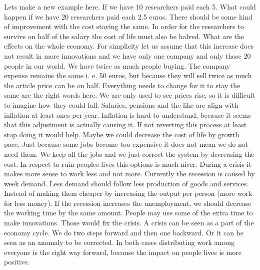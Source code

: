 \documentclass{article}
\begin{document}
Lets make a new example here.
If we have 10 researchers paid each 5.
What could happen if we have 20 researchers paid each 2.5 euros.
There should be some kind of improvement with the cost staying the same.
In order for the researchers to survive on half of the salary the cost of life must also be halved.
What are the effects on the whole economy.
For simplicity let us assume that this increase does not result in more innovations and we have only one company and only those 20 people in our world.
We have twice as much people buying.
The company expense remains the same i. e. 50 euros, but because they will sell twice as much the article price can be on half.
Everything needs to change for it to stay the same are the right words here.
We are only used to see prices rise, so it is difficult to imagine how they could fall.
Salaries, pensions and the like are align with inflation at least ones per year.
Inflation is hard to understand, because it seems that this adjustment is actually causing it.
If not reverting this process at least stop doing it would help.
Maybe we could decrease the cost of life by growth pace.
Just because some jobs become too expensive it does not mean we do not need them.
We keep all the jobs and we just correct the system by decreasing the cost.
In respect to ruin peoples lives this options is much nicer.
During a crisis it makes more sense to work less and not more.
Currently the recession is caused by week demand.
Less demand should follow less production of goods and services.
Instead of making them cheaper by increasing the output per person (more work for less money).
If the recession increases the unemployment, we should decrease the working time by the same amount.
People may use some of the extra time to make innovations.
Those would fix the crisis.
A crisis can be seen as a part of the economy cycle.
We do two steps forward and then one backward.
Or it can be seen as an anomaly to be corrected.
In both cases distributing work among everyone is the right way forward, because the impact on people lives is more positive.
\end{document}
